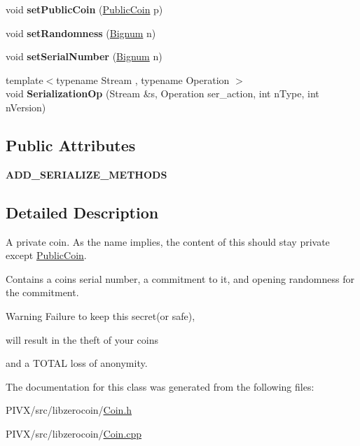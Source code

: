 \begin{DoxyCompactItemize}
void {\bfseries set\+Public\+Coin} (\mbox{\hyperlink{classlibzerocoin_1_1_public_coin}{Public\+Coin}} p)
\item 
\mbox{\label{classlibzerocoin_1_1_private_coin_af80430da4889f121463d3b307f1b54c1}} 
void {\bfseries set\+Randomness} (\mbox{\hyperlink{class_c_big_num}{Bignum}} n)
\item 
\mbox{\label{classlibzerocoin_1_1_private_coin_a5fab5444ca5ea9b46aef56cb76588f20}} 
void {\bfseries set\+Serial\+Number} (\mbox{\hyperlink{class_c_big_num}{Bignum}} n)
\item 
\mbox{\label{classlibzerocoin_1_1_private_coin_a0adbc7a836e42357b1dd424d1ff0784c}} 
{\footnotesize template$<$typename Stream , typename Operation $>$ }\\void {\bfseries Serialization\+Op} (Stream \&s, Operation ser\+\_\+action, int n\+Type, int n\+Version)
\end{DoxyCompactItemize}
\subsection*{Public Attributes}
\begin{DoxyCompactItemize}
\item 
\mbox{\label{classlibzerocoin_1_1_private_coin_a5f452ce485da2fce88de6868c2e9410b}} 
{\bfseries A\+D\+D\+\_\+\+S\+E\+R\+I\+A\+L\+I\+Z\+E\+\_\+\+M\+E\+T\+H\+O\+DS}
\end{DoxyCompactItemize}


\subsection{Detailed Description}
A private coin. As the name implies, the content of this should stay private except \mbox{\hyperlink{classlibzerocoin_1_1_public_coin}{Public\+Coin}}.

Contains a coin\textquotesingle{}s serial number, a commitment to it, and opening randomness for the commitment.

\begin{DoxyWarning}{Warning}
Failure to keep this secret(or safe), 

will result in the theft of your coins 

and a T\+O\+T\+AL loss of anonymity. 
\end{DoxyWarning}


The documentation for this class was generated from the following files\+:\begin{DoxyCompactItemize}
\item 
P\+I\+V\+X/src/libzerocoin/\mbox{\hyperlink{_coin_8h}{Coin.\+h}}\item 
P\+I\+V\+X/src/libzerocoin/\mbox{\hyperlink{_coin_8cpp}{Coin.\+cpp}}\end{DoxyCompactItemize}
